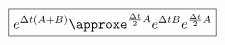\documentclass[preview]{standalone}
\begin{document}
\begin{align*}
\special{dvisvgm:raw <g id='unique000'>}\boxed{e^{\Delta t(A+B)}\approxe^{\frac{\Delta t}{2}A}e^{\Delta t B}e^{\frac{\Delta t}{2}A}}\special{dvisvgm:raw </g>}
\end{align*}
\end{document}
